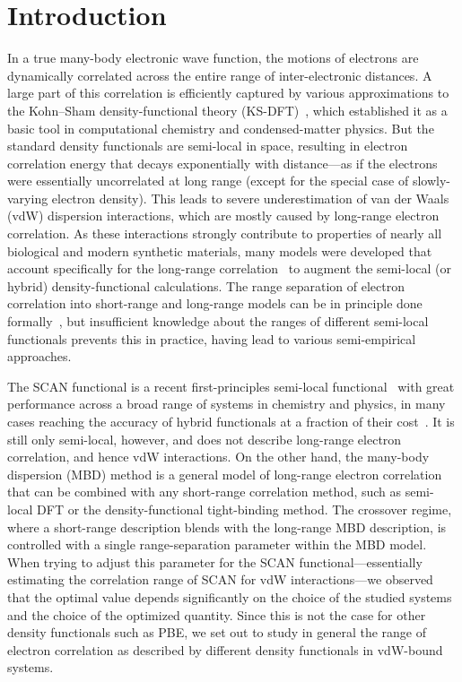 \section{Introduction}

In a true many-body electronic wave function, the motions of electrons are dynamically correlated across the entire range of inter-electronic distances.
A large part of this correlation is efficiently captured by various approximations to the Kohn--Sham density-functional theory (KS-DFT)~\cite{KohnPR65}, which established it as a basic tool in computational chemistry and condensed-matter physics.
But the standard density functionals are semi-local in space, resulting in electron correlation energy that decays exponentially with distance---as if the electrons were essentially uncorrelated at long range (except for the special case of slowly-varying electron density).
This leads to severe underestimation of van der Waals (vdW) dispersion interactions, which are mostly caused by long-range electron correlation.
As these interactions strongly contribute to properties of nearly all biological and modern synthetic materials, many models were developed that account specifically for the long-range correlation~\cite{DionPRL04,VydrovJCP10a,JohnsonJCP06,TkatchenkoPRL09,GrimmeJCP10,AmbrosettiJCP14} to augment the semi-local (or hybrid) density-functional calculations.
The range separation of electron correlation into short-range and long-range models can be in principle done formally~\cite{HermannCR17}, but insufficient knowledge about the ranges of different semi-local functionals prevents this in practice, having lead to various semi-empirical approaches.

The SCAN functional is a recent first-principles semi-local functional~\cite{SunPRL15} with great performance across a broad range of systems in chemistry and physics, in many cases reaching the accuracy of hybrid functionals at a fraction of their cost~\cite{SunNC16}.
It is still only semi-local, however, and does not describe long-range electron correlation, and hence vdW interactions.
On the other hand, the many-body dispersion (MBD) method is a general model of long-range electron correlation~\cite{TkatchenkoPRL12,AmbrosettiJCP14} that can be combined with any short-range correlation method, such as semi-local DFT or the density-functional tight-binding method.
The crossover regime, where a short-range description blends with the long-range MBD description, is controlled with a single range-separation parameter within the MBD model.
When trying to adjust this parameter for the SCAN functional---essentially estimating the correlation range of SCAN for vdW interactions---we observed that the optimal value depends significantly on the choice of the studied systems and the choice of the optimized quantity.
Since this is not the case for other density functionals such as PBE, we set out to study in general the range of electron correlation as described by different density functionals in vdW-bound systems.

